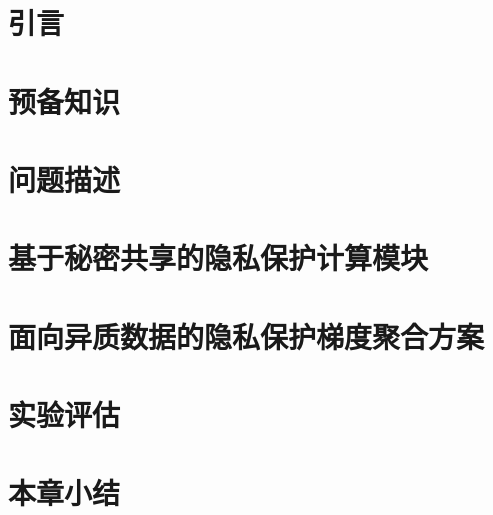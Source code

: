 
\section{引言}

\section{预备知识}

\section{问题描述}

\section{基于秘密共享的隐私保护计算模块}

\section{面向异质数据的隐私保护梯度聚合方案}

\section{实验评估}

\section{本章小结}